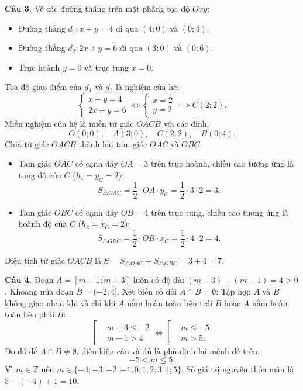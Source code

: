 \documentclass[12pt,a4paper]{article}
\begin{document}
\textbf{Câu 3.} Vẽ các đường thẳng trên mặt phẳng tọa độ $Oxy$:
\begin{itemize}[leftmargin=0.5cm, itemsep=1pt, topsep=1pt]
    \item Đường thẳng $d_1\colon x + y = 4$ đi qua $(4; 0)$ và $(0; 4)$.
    \item Đường thẳng $d_2\colon 2x + y = 6$ đi qua $(3; 0)$ và $(0; 6)$.
    \item Trục hoành $y = 0$ và trục tung $x = 0$.
\end{itemize}
Tọa độ giao điểm của $d_1$ và $d_2$ là nghiệm của hệ:
\[
\begin{cases}
x + y = 4 \\
2x + y = 6
\end{cases}
\iff
\begin{cases}
x = 2 \\
y = 2
\end{cases}
\implies C(2; 2).
\]
Miền nghiệm của hệ là miền tứ giác $OACB$ với các đỉnh:
\[
O(0; 0),\quad A(3; 0),\quad C(2; 2),\quad B(0; 4).
\]
Chia tứ giác $OACB$ thành hai tam giác $OAC$ và $OBC$:
\begin{itemize}[leftmargin=0.5cm, itemsep=1pt, topsep=1pt]
    \item Tam giác $OAC$ có cạnh đáy $OA = 3$ trên trục hoành, chiều cao tương ứng là tung độ của $C$ ($h_1 = y_C = 2$):
    \[
    S_{\triangle OAC} = \dfrac{1}{2} \cdot OA \cdot y_C = \dfrac{1}{2} \cdot 3 \cdot 2 = 3.
    \]
    \item Tam giác $OBC$ có cạnh đáy $OB = 4$ trên trục tung, chiều cao tương ứng là hoành độ của $C$ ($h_2 = x_C = 2$):
    \[
    S_{\triangle OBC} = \dfrac{1}{2} \cdot OB \cdot x_C = \dfrac{1}{2} \cdot 4 \cdot 2 = 4.
    \]
\end{itemize}
Diện tích tứ giác $OACB$ là $S = S_{\triangle OAC} + S_{\triangle OBC} = 3 + 4 = 7$.

\textbf{Câu 4.} Đoạn $A = [m - 1; m + 3]$ luôn có độ dài $(m + 3) - (m - 1) = 4 > 0$.
Khoảng nửa đoạn $B = (-2; 4]$.
Xét biến cố đối $A \cap B = \emptyset$:
Tập hợp $A$ và $B$ không giao nhau khi và chỉ khi $A$ nằm hoàn toàn bên trái $B$ hoặc $A$ nằm hoàn toàn bên phải $B$:
\[
\left[
\begin{aligned}
&m + 3 \le -2 \\
&m - 1 > 4
\end{aligned}
\right.
\iff
\left[
\begin{aligned}
&m \le -5 \\
&m > 5.
\end{aligned}
\right.
\]
Do đó để $A \cap B \ne \emptyset$, điều kiện cần và đủ là phủ định lại mệnh đề trên:
\[
-5 < m \le 5.
\]
Vì $m \in \mathbb{Z}$ nên $m \in \{-4; -3; -2; -1; 0; 1; 2; 3; 4; 5\}$.
Số giá trị nguyên thỏa mãn là $5 - (-4) + 1 = 10$.
\end{document}
